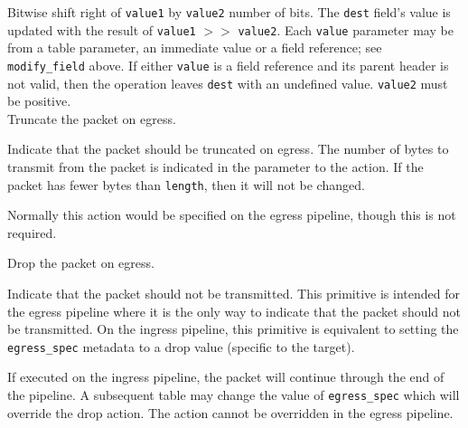 \documentclass[12pt]{article}
\begin{document}

{ %
Bitwise shift right of \texttt{value1} by \texttt{value2} number of bits.
}
{ %
}
{ %
The \texttt{dest} field's value is updated with the result of
\texttt{value1} $>>$ \texttt{value2}. Each \texttt{value} parameter may be from a
table parameter, an immediate value or a field reference; see \texttt{modify_field} above. If either \texttt{value}
is a field reference and its parent header is not valid, then the operation
leaves \texttt{dest} with an undefined value. \texttt{value2} must be positive.
}\\


{ %
Truncate the packet on egress.
}
{ %
}
{ %
Indicate that the packet should be truncated on egress.  The number of bytes
to transmit from the packet is indicated in the parameter to the action.  If
the packet has fewer bytes than \texttt{length}, then it will not be changed.

Normally this action would be specified on the egress pipeline, though this
is not required.
}


{ %
Drop the packet on egress.
}
{ %
}
{ %
Indicate that the packet should not be transmitted. This primitive is intended
for the egress pipeline where it is the only way to indicate that the packet
should not be transmitted. On the ingress pipeline, this primitive is equivalent
to setting the \texttt{egress_spec} metadata to a drop value (specific to the target).


If executed on the ingress pipeline, the packet will continue through the
end of the pipeline. A subsequent table may change the value of \texttt{egress_spec} which
will override the drop action. The action cannot be overridden in the egress
pipeline.
}

\end{document}

